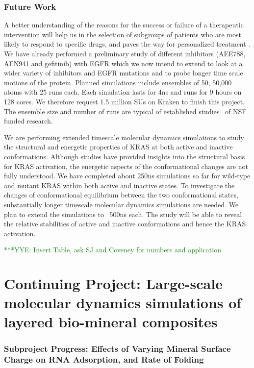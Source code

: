 \documentclass[a4paper,10pt]{article}
\newcommand{\yyenote}[1]{ {\textcolor{green} { ***YYE: #1 }}}
\newcommand{\yyenote}[1]{ {}}
\begin{document}
\subsubsection{Future Work}
A better understanding of the reasons for the success or failure of a therapeutic intervention will help us in the selection of subgroups of patients who are most likely to respond to specific drugs, and paves the way for personalized treatment \cite{bib:hiv}. We have already performed a preliminary study of different inhibitors (AEE788, AFN941 and gefitinib) with EGFR which we now intend to extend to look at a wider variety of inhibitors and EGFR mutations and to probe longer time scale motions of the protein. Planned simulations include ensembles of 50, 50,000 atoms with 25 runs each. Each simulation lasts for 4ns and runs for 9 hours on 128 cores. We therefore request 1.5 million SUs on Kraken to finish this project. The ensemble size and number of runs are typical of established studies~\cite{bib:wan_philtrans,bib:wc2009} of NSF funded research.

We are performing extended timescale molecular dynamics simulations to study the structural and energetic properties of KRAS at both active and inactive conformations. Although studies have provided insights into the structural basis for KRAS activation, the energetic aspects of the conformational changes are not fully understood. We have completed about 250ns simulations so far for wild-type and mutant KRAS within both active and inactive states. To investigate the changes of conformational equilibrium between the two conformational states, substantially longer timescale molecular dynamics simulations are needed. We plan to extend the simulations to ~500ns each. The study will be able to reveal the relative stabilities of active and inactive conformations and hence the KRAS activation.

\yyenote{Insert Table, ask SJ and Coveney for numbers and application}


\section{Continuing Project: Large-scale molecular dynamics simulations of layered bio-mineral composites}

\subsubsection{Subproject Progress: Effects of Varying Mineral Surface Charge on RNA Adsorption, and Rate of Folding}
\end{document}
